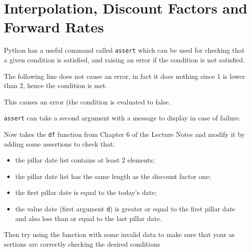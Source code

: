 \chapter{Interpolation, Discount Factors and Forward Rates}\label{introduction-to-python---lesson-6}

\begin{Exercise}[title={(Assertion)}]
Python has a useful command called \texttt{assert} which can be used for
checking that a given condition is satisfied, and raising an error if
the condition is not satisfied.

The following line does not cause an error, in fact it does nothing since 1 is lower than 2, hence the condition is met.

\begin{Shaded}
\begin{Highlighting}[]
  \OperatorTok{<} 
\end{Highlighting}
\end{Shaded}

This causes an error (the condition is evaluated to false. 

\begin{Shaded}
\begin{Highlighting}[]
  \OperatorTok{>} 
\end{Highlighting}
\end{Shaded}

\texttt{assert} can take a second argument with a message to display in case of failure.

\begin{Shaded}
\begin{Highlighting}[]
  \OperatorTok{>} \NormalTok{, }
\end{Highlighting}
\end{Shaded}

Now takes the \texttt{df} function from Chapter 6 of the Lecture Notes and modify it by adding some assertions to check that:

\begin{itemize}
\tightlist
\item
  the pillar date list contains at least 2 elements;
\item
  the pillar date list has the same length as the discount factor one;
\item
  the first pillar date is equal to the today's date;
\item
  the value date (first argument \texttt{d}) is greater or equal to the first pillar
  date and also less than or equal to the last pillar date.
\end{itemize}

Then try using the function with some invalid data to make sure that your as sertions are correctly checking the desired conditions
\end{Exercise}

